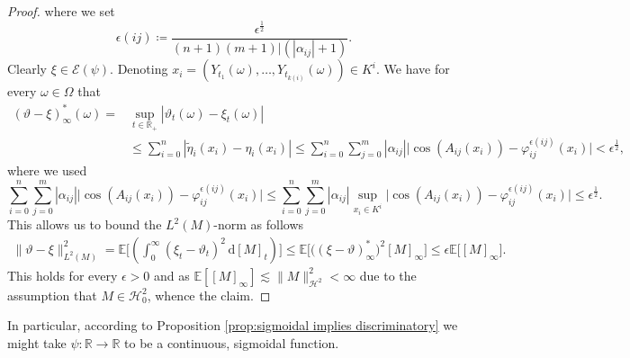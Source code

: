 \documentclass[11pt,a4paper,twoside,openany]{report}
\numberwithin{equation}{section}
\newcommand{\diff}{\mathrm{d}}
\theoremstyle{plain} %
\theoremstyle{definition} %
\theoremstyle{remark} %
\begin{document}
\begin{proof}
where we set
\begin{equation*}
    \epsilon(ij)\coloneqq\frac{\epsilon^{\frac{1}{2}}}{(n+1)(m+1)|(|\alpha_{ij}|+1)}.
\end{equation*}
Clearly \(\xi\in\mathcal{E}(\psi)\). Denoting \(x_i=(Y_{t_1}(\omega),\dots,Y_{t_{k(i)}}(\omega))\in K^i\). We have for every \(\omega\in\Omega\) that 
\begin{align*}
    (\vartheta-\xi)^*_{\infty}(\omega)=&\sup_{t\in\mathbb{R}_+}|\vartheta_t(\omega)-\xi_t(\omega)|
    \\&\leq \sum_{i=0}^{n}|\widetilde{\eta}_i(x_i)-\eta_i(x_i)|\leq \sum_{i=0}^{n}\sum_{j=0}^m|\alpha_{ij}|\Big|\cos(A_{ij}(x_i))-\varphi_{ij}^{\epsilon(ij)}(x_i)\Big|<\epsilon^{\frac{1}{2}},
\end{align*}
where we used
\begin{equation*}
\sum_{i=0}^{n}\sum_{j=0}^m|\alpha_{ij}|\Big|\cos(A_{ij}(x_i))-\varphi_{ij}^{\epsilon(ij)}(x_i)\Big|
\leq \sum_{i=0}^{n}\sum_{j=0}^m|\alpha_{ij}|\sup_{x_i\in K^i}\Big|\cos(A_{ij}(x_i))-\varphi_{ij}^{\epsilon(ij)}(x_i)\Big|\leq
\epsilon^{\frac{1}{2}}.
\end{equation*}
This allows us to bound the \(L^2(M)\)-norm as follows
\begin{align*}
    \lVert\vartheta-\xi\rVert_{L^2(M)}^2=\mathbb{E}\bigg[(\int_{0}^{\infty}(\xi_t-\vartheta_t)^2\,\diff [M]_t)\bigg]\leq \mathbb{E}\big[\big((\xi-\vartheta)_{\infty}^*\big)^2[M]_{\infty}\big]\leq\epsilon\mathbb{E}\big[[M]_{\infty}\big].
\end{align*}
This holds for every \(\epsilon>0\) and as
\(\mathbb{E}[[M]_{\infty}]\lesssim\lVert M\rVert_{\mathcal{H}^2}^2<\infty\) due to the assumption that \(M\in\mathcal{H}^2_0\), whence the claim.
\end{proof}
In particular, according to Proposition \ref{prop:sigmoidal implies discriminatory} we might take \(\psi:\mathbb{R}\to\mathbb{R}\) to be a continuous, sigmoidal function. 
\end{document}
